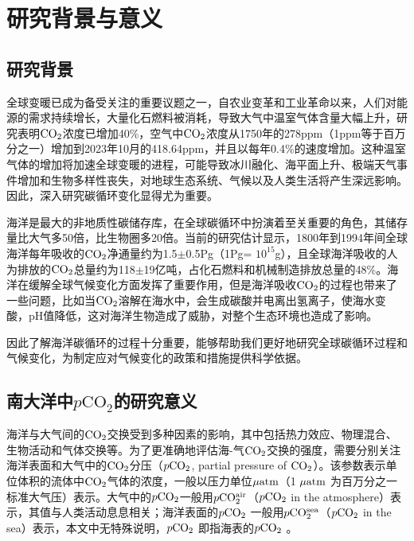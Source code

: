 \section{研究背景与意义}
\subsection{研究背景}
全球变暖已成为备受关注的重要议题之一，自农业变革和工业革命以来，人们对能源的需求持续增长，大量化石燃料被消耗，导致大气中温室气体含量大幅上升，研究表明$\rm CO_2$浓度已增加40\%，空气中$\rm CO_2$浓度从1750年的278ppm（1ppm等于百万分之一）增加到2023年10月的418.64ppm，并且以每年0.4\%的速度增加\cite{lan2024trends,JDYZ200103003}。这种温室气体的增加将加速全球变暖的进程，可能导致冰川融化、海平面上升、极端天气事件增加和生物多样性丧失，对地球生态系统、气候以及人类生活将产生深远影响\cite{陈立奇2004北极地区碳循环研究意义和展望,RASOOL_DE_BERGH_1970,Haines_2003,苏茜2017,ZKJZ200907010}。因此，深入研究碳循环变化显得尤为重要。

海洋是最大的非地质性碳储存库，在全球碳循环中扮演着至关重要的角色，其储存量比大气多50倍，比生物圈多20倍\cite{陈立奇2004北极地区碳循环研究意义和展望,SJKF200204011}。当前的研究估计显示，1800年到1994年间全球海洋每年吸收的$\rm CO_2$净通量约为1.5$\pm$0.5Pg（1Pg= $10^{15}$g），且全球海洋吸收的人为排放的$\rm CO_2$总量约为118$\pm$19亿吨，占化石燃料和机械制造排放总量的48\%\cite{Sabine_2004}。海洋在缓解全球气候变化方面发挥了重要作用\cite{DXJZ201204005}，但是海洋吸收$\rm CO_2$的过程也带来了一些问题，比如当$\rm CO_2$溶解在海水中，会生成碳酸并电离出氢离子，使海水变酸，pH值降低，这对海洋生物造成了威胁，对整个生态环境也造成了影响\cite{海水酸化对海洋生物影响的研究进展,升温耦合酸化对大型海藻灾害种氮响应与吸收机制研究,苏茜2017,JDYZ201603011}。

因此了解海洋碳循环的过程十分重要，能够帮助我们更好地研究全球碳循环过程和气候变化，为制定应对气候变化的政策和措施提供科学依据。

\subsection{南大洋中\texorpdfstring{$p\mathrm{CO_2}$}{}的研究意义}
海洋与大气间的$\rm CO_2$交换受到多种因素的影响，其中包括热力效应、物理混合、生物活动和气体交换等\cite{clargo2015rapid,周洁_2014,陈鑫2012,lefevre2002estimating}。为了更准确地评估海-气$\rm CO_2$交换的强度，需要分别关注海洋表面和大气中的$\rm CO_2$分压（$p\rm CO_2$, partial pressure of $\rm CO_2$）。该参数表示单位体积的流体中$\rm CO_2$气体的浓度，一般以压力单位$\rm \mu atm$（1 $\rm \mu atm$ 为百万分之一标准大气压）表示。大气中的$p\rm CO_2$一般用$p\rm CO_2^{air}$（$p\rm CO_2$ in the atmosphere）表示，其值与人类活动息息相关；海洋表面的$p\rm CO_2$ 一般用$p\rm CO_2^{sea}$（$p\rm CO_2$ in the sea）表示，本文中无特殊说明，$p\rm CO_2$ 即指海表的$p\rm CO_2$ 。

